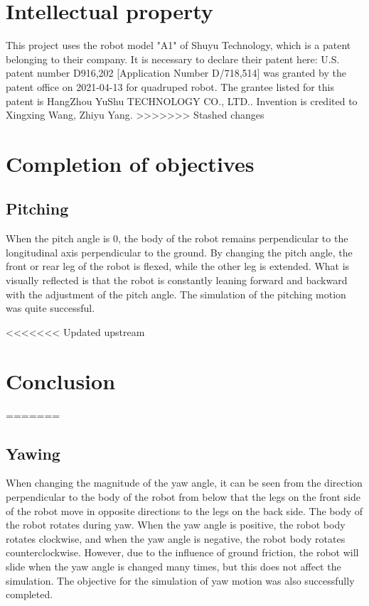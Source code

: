 \section{Intellectual property}
This project uses the robot model "A1" of Shuyu Technology, which is a patent belonging to their company. It is necessary to declare their patent here: U.S. patent number D916,202 [Application Number D/718,514] was granted by the patent office on 2021-04-13 for quadruped robot. The grantee listed for this patent is HangZhou YuShu TECHNOLOGY CO., LTD.. Invention is credited to Xingxing Wang, Zhiyu Yang.
>>>>>>> Stashed changes

\section{Completion of objectives}
\subsection{Pitching}
When the pitch angle is 0, the body of the robot remains perpendicular to the longitudinal axis perpendicular to the ground. By changing the pitch angle, the front or rear leg of the robot is flexed, while the other leg is extended. What is visually reflected is that the robot is constantly leaning forward and backward with the adjustment of the pitch angle. The simulation of the pitching motion was quite successful.

<<<<<<< Updated upstream






\section{Conclusion}
=======
\subsection{Yawing}
When changing the magnitude of the yaw angle, it can be seen from the direction perpendicular to the body of the robot from below that the legs on the front side of the robot move in opposite directions to the legs on the back side. The body of the robot rotates during yaw. When the yaw angle is positive, the robot body rotates clockwise, and when the yaw angle is negative, the robot body rotates counterclockwise. However, due to the influence of ground friction, the robot will slide when the yaw angle is changed many times, but this does not affect the simulation. The objective for the simulation of yaw motion was also successfully completed.

